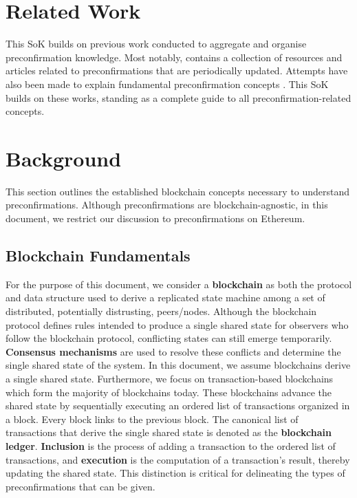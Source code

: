 \documentclass[a4paper]{article}
\theoremstyle{boldstyle}
\begin{document}
\section{Related Work}

This SoK builds on previous work conducted to aggregate and organise preconfirmation knowledge. Most notably, \cite{W:AwesomeBasedPreconfirmations} contains a collection of resources and articles related to preconfirmations that are periodically updated. Attempts have also been made to explain fundamental preconfirmation concepts \cite{W:PreconfirmationsGlossaryRequirements, W:Preconfirmations:Explained}. This SoK builds on these works, standing as a complete guide to all preconfirmation-related concepts. 


\section{Background} 
\label{sec:background}
This section outlines the established blockchain concepts necessary to understand preconfirmations. Although preconfirmations are blockchain-agnostic, in this document, we restrict our discussion to preconfirmations on Ethereum.

    \subsection{Blockchain Fundamentals}
    \label{subsec:BlockchainFundamentals}
    For the purpose of this document, we consider a \textbf{blockchain} as both the protocol and data structure used to derive a replicated state machine among a set of distributed, potentially distrusting, peers/nodes. Although the blockchain protocol defines rules %
    intended to produce a single shared state for observers who follow the blockchain protocol, conflicting states can still emerge temporarily. \textbf{Consensus mechanisms} are used to resolve these conflicts and determine the single shared state of the system. In this document, we assume blockchains derive a single shared state. Furthermore, we focus on transaction-based blockchains which form the majority of blockchains today. These blockchains advance the shared state by sequentially executing an ordered list of transactions organized in a block. Every block links to the previous block. The canonical list of transactions that derive the single shared state is denoted as the \textbf{blockchain ledger}. \textbf{Inclusion} is the process of adding a transaction to the ordered list of transactions, and \textbf{execution} is the computation of a transaction's result, thereby updating the shared state. This distinction is critical for delineating the types of preconfirmations that can be given. 
    
\end{document}
